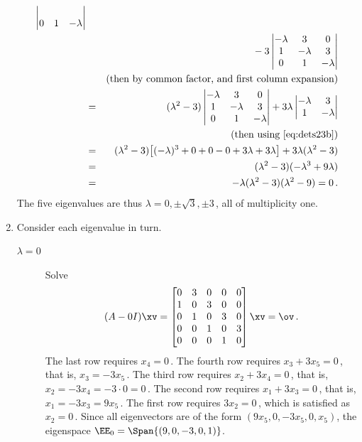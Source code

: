 \begin{example}
\begin{solution}
\begin{enumerate}
\begin{eqnarray*}
\begin{vmatrix}
\\0&1&-\lambda\end{vmatrix}
\\&&{}
-3\begin{vmatrix}-\lambda&3&0
\\1&-\lambda&3
\\0&1&-\lambda\end{vmatrix}
\\&&(\text{then by common factor, and first column expansion})
\\&=&(\lambda^2-3)\begin{vmatrix}-\lambda&3&0
\\1&-\lambda&3
\\0&1&-\lambda\end{vmatrix}
+3\lambda\begin{vmatrix}-\lambda&3
\\1&-\lambda\end{vmatrix}
\\&&(\text{then using~\eqref{eq:dets23b}})
\\&=&(\lambda^2-3)\big[(-\lambda)^3+0+0-0+3\lambda+3\lambda\big]
+3\lambda(\lambda^2-3)
\\&=&(\lambda^2-3)(-\lambda^3+9\lambda)
\\&=&-\lambda(\lambda^2-3)(\lambda^2-9)=0\,.
\end{eqnarray*}
The five eigenvalues are thus \(\lambda=0,\pm\sqrt3,\pm3\)\,, all of multiplicity one.

\item Consider each eigenvalue in turn.
\begin{description}
\item[\(\lambda=0\)]  Solve
\begin{equation*}
(A-0I)\xv=\begin{bmatrix}0&3&0&0&0
\\1&0&3&0&0
\\0&1&0&3&0
\\0&0&1&0&3
\\0&0&0&1&0\end{bmatrix}\xv=\ov\,.
\end{equation*}
The last row requires \(x_4=0\)\,.
The fourth row requires \(x_3+3x_5=0\)\,, that is, \(x_3=-3x_5\)\,.
The third row requires \(x_2+3x_4=0\)\,, that is, \(x_2=-3x_4=-3\cdot 0=0\)\,.
The second row requires \(x_1+3x_3=0\)\,, that is, \(x_1=-3x_3=9x_5\)\,.
The first row requires \(3x_2=0\)\,, which is satisfied as \(x_2=0\)\,.
Since all eigenvectors are of the form \((9x_5,0,-3x_5,0,x_5)\), the eigenspace \(\EE_0=\Span\{(9,0,-3,0,1)\}\).


\end{description}
\end{enumerate}
\end{solution}
\end{example}
